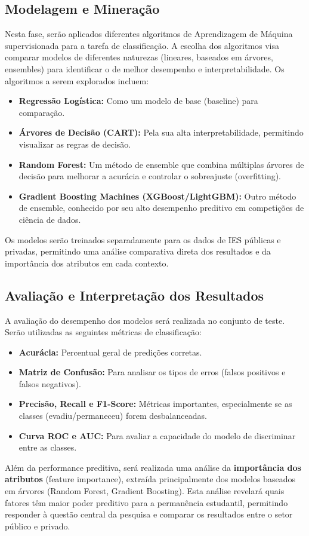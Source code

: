 \documentclass[english, brazilian]{RBIEarticle}
\begin{document}
\subsection{Modelagem e Mineração}
Nesta fase, serão aplicados diferentes algoritmos de Aprendizagem de Máquina supervisionada para a tarefa de classificação. A escolha dos algoritmos visa comparar modelos de diferentes naturezas (lineares, baseados em árvores, ensembles) para identificar o de melhor desempenho e interpretabilidade. Os algoritmos a serem explorados incluem:
\begin{itemize}
    \item \textbf{Regressão Logística:} Como um modelo de base (baseline) para comparação.
    \item \textbf{Árvores de Decisão (CART):} Pela sua alta interpretabilidade, permitindo visualizar as regras de decisão.
    \item \textbf{Random Forest:} Um método de ensemble que combina múltiplas árvores de decisão para melhorar a acurácia e controlar o sobreajuste (overfitting).
    \item \textbf{Gradient Boosting Machines (XGBoost/LightGBM):} Outro método de ensemble, conhecido por seu alto desempenho preditivo em competições de ciência de dados.
\end{itemize}
Os modelos serão treinados separadamente para os dados de IES públicas e privadas, permitindo uma análise comparativa direta dos resultados e da importância dos atributos em cada contexto.

\subsection{Avaliação e Interpretação dos Resultados}
A avaliação do desempenho dos modelos será realizada no conjunto de teste. Serão utilizadas as seguintes métricas de classificação:
\begin{itemize}
    \item \textbf{Acurácia:} Percentual geral de predições corretas.
    \item \textbf{Matriz de Confusão:} Para analisar os tipos de erros (falsos positivos e falsos negativos).
    \item \textbf{Precisão, Recall e F1-Score:} Métricas importantes, especialmente se as classes (evadiu/permaneceu) forem desbalanceadas.
    \item \textbf{Curva ROC e AUC:} Para avaliar a capacidade do modelo de discriminar entre as classes.
\end{itemize}
Além da performance preditiva, será realizada uma análise da \textbf{importância dos atributos} (feature importance), extraída principalmente dos modelos baseados em árvores (Random Forest, Gradient Boosting). Esta análise revelará quais fatores têm maior poder preditivo para a permanência estudantil, permitindo responder à questão central da pesquisa e comparar os resultados entre o setor público e privado.
\end{document}
